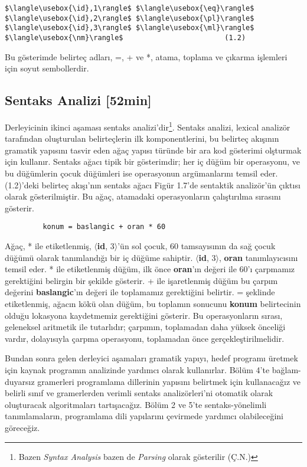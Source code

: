 \documentclass{book}
\begin{document}
\begin{lstlisting}[mathescape]
 		 $\langle\usebox{\id},1\rangle$ $\langle\usebox{\eq}\rangle$ $\langle\usebox{\id},2\rangle$ $\langle\usebox{\pl}\rangle$ $\langle\usebox{\id},3\rangle$ $\langle\usebox{\ml}\rangle$ $\langle\usebox{\nm}\rangle$			             (1.2)
\end{lstlisting}

Bu gösterimde belirteç adları, =, + ve *, atama, toplama ve çıkarma işlemleri için soyut sembollerdir.


\subsection{Sentaks Analizi [52min]}
Derleyicinin ikinci aşaması sentaks analizi'dir\footnote{Bazen \textit{Syntax Analysis} bazen de \textit{Parsing} olarak gösterilir (Ç.N.)}. Sentaks analizi, lexical analizör tarafından oluşturulan belirteçlerin ilk komponentlerini, bu belirteç akışının gramatik yapısını tasvir eden ağaç yapısı türünde bir ara kod gösterimi olşturmak için kullanır. Sentaks ağacı tipik bir gösterimdir; her iç düğüm bir operasyonu, ve bu düğümlerin çocuk düğümleri ise operasyonun argümanlarını temsil eder. (1.2)'deki belirteç akışı'nın sentaks ağacı Figür 1.7'de sentaktik analizör'ün çıktısı olarak gösterilmiştir.  Bu ağaç, atamadaki operasyonların çalıştırılma sırasını gösterir.
\begin{lstlisting}
 	     konum = baslangic + oran * 60        
\end{lstlisting}
Ağaç, * ile etiketlenmiş, $\langle$\textbf{id}, 3$\rangle$'ün sol çocuk, 60 tamsayısının da sağ çocuk düğümü olarak tanımlandığı bir iç düğüme sahiptir. $\langle$\textbf{id}, 3$\rangle$, \textbf{oran} tanımlayıcısını temsil eder. * ile etiketlenmiş düğüm, ilk önce \textbf{oran}'ın değeri ile 60'ı çarpmamız gerektiğini belirgin bir şekilde gösterir. + ile işaretlenmiş düğüm bu çarpım değerini \textbf{baslangic}'ın değeri ile toplamamız gerektiğini belirtir. = şeklinde etiketlenmiş, ağacın kökü olan düğüm, bu toplamın sonucunu \textbf{konum} belirtecinin olduğu lokasyona kaydetmemiz gerektiğini gösterir. Bu operasyonların sırası, geleneksel aritmetik ile tutarlıdır; çarpımın, toplamadan daha yüksek önceliği vardır, dolayısıyla çarpma operasyonu, toplamadan önce gerçekleştirilmelidir.

Bundan sonra gelen derleyici aşamaları gramatik yapıyı, hedef programı üretmek için kaynak programın analizinde yardımcı olarak kullanırlar. Bölüm 4'te bağlam-duyarsız gramerleri programlama dillerinin yapısını belirtmek için kullanacağız ve belirli sınıf ve gramerlerden verimli sentaks analizörleri'ni otomatik olarak oluşturacak algoritmaları tartışacağız. Bölüm 2 ve 5'te sentaks-yönelimli tanımlamaların, programlama dili yapılarını çevirmede yardımcı olabileceğini göreceğiz.
\end{document}
